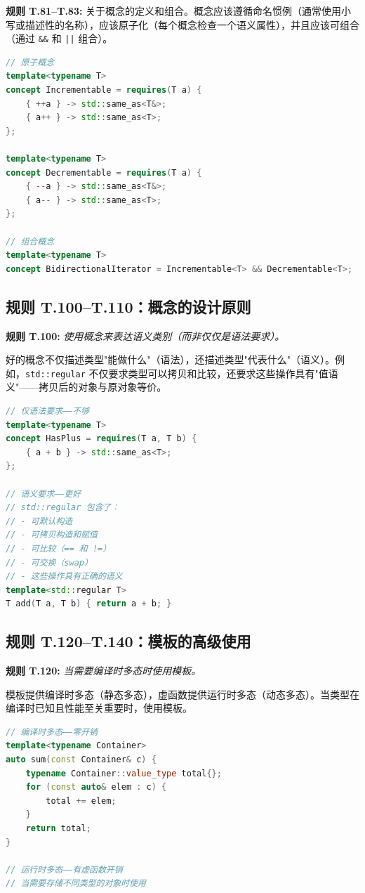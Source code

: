 \textbf{规则 T.81--T.83:} 关于概念的定义和组合。概念应该遵循命名惯例（通常使用小写或描述性的名称），应该原子化（每个概念检查一个语义属性），并且应该可组合（通过 \texttt{\&\&} 和 \texttt{||} 组合）。

\begin{lstlisting}[language=C++]
// 原子概念
template<typename T>
concept Incrementable = requires(T a) {
    { ++a } -> std::same_as<T&>;
    { a++ } -> std::same_as<T>;
};

template<typename T>
concept Decrementable = requires(T a) {
    { --a } -> std::same_as<T&>;
    { a-- } -> std::same_as<T>;
};

// 组合概念
template<typename T>
concept BidirectionalIterator = Incrementable<T> && Decrementable<T>;
\end{lstlisting}

\subsection{规则 T.100--T.110：概念的设计原则}

\textbf{规则 T.100:} \textit{使用概念来表达语义类别（而非仅仅是语法要求）。}

好的概念不仅描述类型"能做什么"（语法），还描述类型"代表什么"（语义）。例如，\texttt{std::regular} 不仅要求类型可以拷贝和比较，还要求这些操作具有"值语义"——拷贝后的对象与原对象等价。

\begin{lstlisting}[language=C++]
// 仅语法要求——不够
template<typename T>
concept HasPlus = requires(T a, T b) {
    { a + b } -> std::same_as<T>;
};

// 语义要求——更好
// std::regular 包含了：
// - 可默认构造
// - 可拷贝构造和赋值
// - 可比较（== 和 !=）
// - 可交换（swap）
// - 这些操作具有正确的语义
template<std::regular T>
T add(T a, T b) { return a + b; }
\end{lstlisting}

\subsection{规则 T.120--T.140：模板的高级使用}

\textbf{规则 T.120:} \textit{当需要编译时多态时使用模板。}

模板提供编译时多态（静态多态），虚函数提供运行时多态（动态多态）。当类型在编译时已知且性能至关重要时，使用模板。

\begin{lstlisting}[language=C++]
// 编译时多态——零开销
template<typename Container>
auto sum(const Container& c) {
    typename Container::value_type total{};
    for (const auto& elem : c) {
        total += elem;
    }
    return total;
}

// 运行时多态——有虚函数开销
// 当需要存储不同类型的对象时使用
\end{lstlisting}

